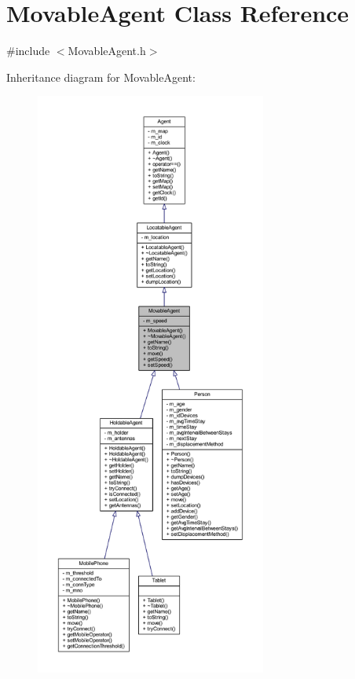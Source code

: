 \hypertarget{class_movable_agent}{}\section{Movable\+Agent Class Reference}
\label{class_movable_agent}


{\ttfamily \#include $<$Movable\+Agent.\+h$>$}



Inheritance diagram for Movable\+Agent\+:\nopagebreak
\begin{figure}[H]
\begin{center}
\leavevmode
\includegraphics[height=550pt]{class_movable_agent__inherit__graph}
\end{center}
\end{figure}


